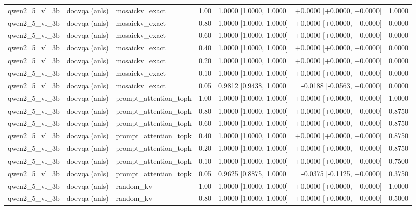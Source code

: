 \begin{longtable}{lllrrrr}
qwen2\_5\_vl\_3b & docvqa (anls) & mosaickv\_exact & 1.00 & 1.0000 [1.0000, 1.0000] & +0.0000 [+0.0000, +0.0000] & 1.0000 \\
qwen2\_5\_vl\_3b & docvqa (anls) & mosaickv\_exact & 0.80 & 1.0000 [1.0000, 1.0000] & +0.0000 [+0.0000, +0.0000] & 0.0000 \\
qwen2\_5\_vl\_3b & docvqa (anls) & mosaickv\_exact & 0.60 & 1.0000 [1.0000, 1.0000] & +0.0000 [+0.0000, +0.0000] & 0.0000 \\
qwen2\_5\_vl\_3b & docvqa (anls) & mosaickv\_exact & 0.40 & 1.0000 [1.0000, 1.0000] & +0.0000 [+0.0000, +0.0000] & 0.0000 \\
qwen2\_5\_vl\_3b & docvqa (anls) & mosaickv\_exact & 0.20 & 1.0000 [1.0000, 1.0000] & +0.0000 [+0.0000, +0.0000] & 0.0000 \\
qwen2\_5\_vl\_3b & docvqa (anls) & mosaickv\_exact & 0.10 & 1.0000 [1.0000, 1.0000] & +0.0000 [+0.0000, +0.0000] & 0.0000 \\
qwen2\_5\_vl\_3b & docvqa (anls) & mosaickv\_exact & 0.05 & 0.9812 [0.9438, 1.0000] & -0.0188 [-0.0563, +0.0000] & 0.0000 \\
qwen2\_5\_vl\_3b & docvqa (anls) & prompt\_attention\_topk & 1.00 & 1.0000 [1.0000, 1.0000] & +0.0000 [+0.0000, +0.0000] & 1.0000 \\
qwen2\_5\_vl\_3b & docvqa (anls) & prompt\_attention\_topk & 0.80 & 1.0000 [1.0000, 1.0000] & +0.0000 [+0.0000, +0.0000] & 0.8750 \\
qwen2\_5\_vl\_3b & docvqa (anls) & prompt\_attention\_topk & 0.60 & 1.0000 [1.0000, 1.0000] & +0.0000 [+0.0000, +0.0000] & 0.8750 \\
qwen2\_5\_vl\_3b & docvqa (anls) & prompt\_attention\_topk & 0.40 & 1.0000 [1.0000, 1.0000] & +0.0000 [+0.0000, +0.0000] & 0.8750 \\
qwen2\_5\_vl\_3b & docvqa (anls) & prompt\_attention\_topk & 0.20 & 1.0000 [1.0000, 1.0000] & +0.0000 [+0.0000, +0.0000] & 0.8750 \\
qwen2\_5\_vl\_3b & docvqa (anls) & prompt\_attention\_topk & 0.10 & 1.0000 [1.0000, 1.0000] & +0.0000 [+0.0000, +0.0000] & 0.7500 \\
qwen2\_5\_vl\_3b & docvqa (anls) & prompt\_attention\_topk & 0.05 & 0.9625 [0.8875, 1.0000] & -0.0375 [-0.1125, +0.0000] & 0.3750 \\
qwen2\_5\_vl\_3b & docvqa (anls) & random\_kv & 1.00 & 1.0000 [1.0000, 1.0000] & +0.0000 [+0.0000, +0.0000] & 1.0000 \\
qwen2\_5\_vl\_3b & docvqa (anls) & random\_kv & 0.80 & 1.0000 [1.0000, 1.0000] & +0.0000 [+0.0000, +0.0000] & 0.5000 \\

\end{longtable}

